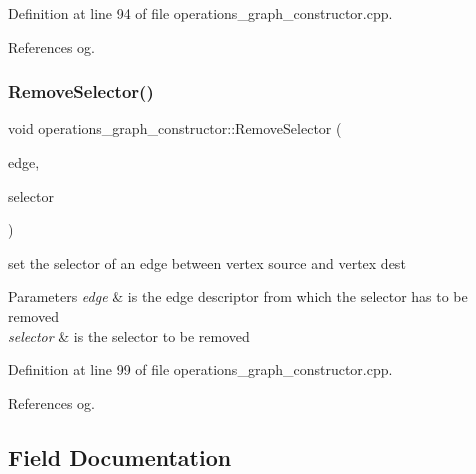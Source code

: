 Definition at line 94 of file operations\+\_\+graph\+\_\+constructor.\+cpp.



References og.

\mbox{\label{classoperations__graph__constructor_a72af4bbb216d489edab5f844aced8767}} 
\subsubsection{\texorpdfstring{Remove\+Selector()}{RemoveSelector()}}
{\footnotesize\ttfamily void operations\+\_\+graph\+\_\+constructor\+::\+Remove\+Selector (\begin{DoxyParamCaption}\item[{const \hyperlink{graph_8hpp_a9eb9afea34e09f484b21f2efd263dd48}{Edge\+Descriptor}}]{edge,  }\item[{const int}]{selector }\end{DoxyParamCaption})}



set the selector of an edge between vertex source and vertex dest 


\begin{DoxyParams}{Parameters}
{\em edge} & is the edge descriptor from which the selector has to be removed \\
\hline
{\em selector} & is the selector to be removed \\
\hline
\end{DoxyParams}


Definition at line 99 of file operations\+\_\+graph\+\_\+constructor.\+cpp.



References og.



\subsection{Field Documentation}
\mbox{\label{classoperations__graph__constructor_a3ed7eebc25cfebe417df7c695340c866}} 
